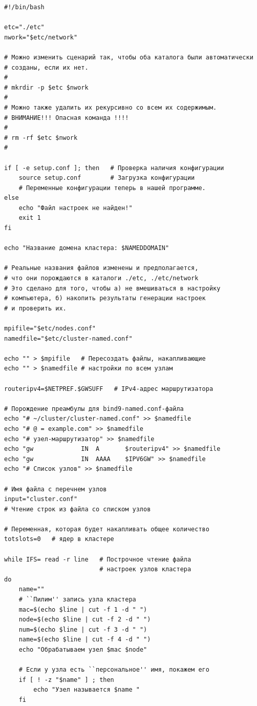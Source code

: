 \documentclass[a4paper,12pt,final,openany]{extbook}
\begin{document}
\begin{verbatim}
#!/bin/bash

etc="./etc"
nwork="$etc/network"

# Можно изменить сценарий так, чтобы оба каталога были автоматически
# созданы, если их нет.
#
# mkrdir -p $etc $nwork
#
# Можно также удалить их рекурсивно со всем их содержимым.
# ВНИМАНИЕ!!! Опасная команда !!!!
#
# rm -rf $etc $nwork
#

if [ -e setup.conf ]; then   # Проверка наличия конфигурации
    source setup.conf        # Загрузка конфигурации
    # Переменные конфигурации теперь в нашей программе.
else
    echo "Файл настроек не найден!"
    exit 1
fi

echo "Название домена кластера: $NAMEDDOMAIN"

# Реальные названия файлов изменены и предполагается,
# что они порождаются в каталоги ./etc, ./etc/network
# Это сделано для того, чтобы а) не вмешиваться в настройку
# компьютера, б) накопить результаты генерации настроек
# и проверить их.

mpifile="$etc/nodes.conf"
namedfile="$etc/cluster-named.conf"

echo "" > $mpifile   # Пересоздать файлы, накапливающие
echo "" > $namedfile # настройки по всем узлам

routeripv4=$NETPREF.$GWSUFF   # IPv4-адрес маршрутизатора

# Порождение преамбулы для bind9-named.conf-файла
echo "# ~/cluster/cluster-named.conf" >> $namedfile
echo "# @ = example.com" >> $namedfile
echo "# узел-маршрутизатор" >> $namedfile
echo "gw             IN  A       $routeripv4" >> $namedfile
echo "gw             IN  AAAA    $IPV6GW" >> $namedfile
echo "# Список узлов" >> $namedfile

# Имя файла с перечнем узлов
input="cluster.conf"
# Чтение строк из файла со списком узлов

# Переменная, которая будет накапливать общее количество
totslots=0   # ядер в кластере

while IFS= read -r line   # Построчное чтение файла
                          # настроек узлов кластера
do
    name=""
    # ``Пилим'' запись узла кластера
    mac=$(echo $line | cut -f 1 -d " ")
    node=$(echo $line | cut -f 2 -d " ")
    num=$(echo $line | cut -f 3 -d " ")
    name=$(echo $line | cut -f 4 -d " ")
    echo "Обрабатываем узел $mac $node"

    # Если у узла есть ``персональное'' имя, покажем его
    if [ ! -z "$name" ] ; then
        echo "Узел называется $name "
    fi


\end{verbatim}
\end{document}
